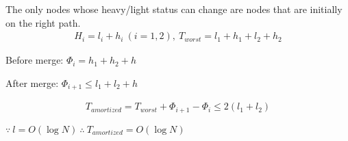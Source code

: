 The only nodes whose heavy/light status can change are nodes that are initially on the right path.
\begin{align*}
    H_i=l_i+h_i\ (i=1,2),\ T_{worst}=l_1+h_1+l_2+h_2
\end{align*}

Before merge: $\Phi_i=h_1+h_2+h$

After merge: $\Phi_{i+1} \le l_1+l_2 +h$

\begin{align*}
    T_{amortized}=T_{worst}+\Phi_{i+1}-\Phi_i\le 2(l_1+l_2)
\end{align*}

$\because\ l=O(\log N)\ \therefore\ T_{amortized}=O(\log N)$